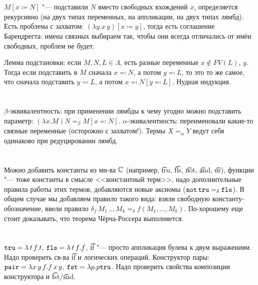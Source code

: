 \section{} %
$M[x \coloneq N]$ "--- подставили $N$ вместо свободных вхождений $x$,
определяется рекурсивно (на двух типах переменных, на аппликации, на двух типах лямбд).
Есть проблема с захватом: $(\lambda y. x\, y)[x \coloneq y]$, тогда есть соглашение
Барендрегта: имена связных выбираем так, чтобы они всегда отличались от имён свободных,
проблем не будет.

Лемма подстановки: если $M, N, L \in \Lambda$, есть разные переменные $x \notin FV(L)$, $y$.
Тогда если подставить в $M$ сначала $x\eqcolon N$, а потом $y \eqcolon L$, то это
то же самое, что сначала подставить $y \eqcolon L$, а потом $x\eqcolon N[y\eqcolon L]$.
Нудная индукция.

\section{} %
$\beta$-эквивалентность: при применении лямбды к чему угодно можно подставить параметр:
$(\lambda x . M)N =_\beta M[x\eqcolon N]$.
$\alpha$-экивалентность: переименовали какие-то связные переменные (осторожно с захватом!).
Термы $X=_\alpha Y$ ведут себя одинаково при редуцировании лямбд.
\TODO

\section{} %
Можно добавить константы из мн-ва $\mathbb{C}$ (например, \t{tru}, \t{fls}, \t{not}, \t{and}, \t{or}),
функции "--- тоже константы в смысле <<константный терм>>,
надо дополнительные правила работы этих термов, добавляются новые аксиомы ($\texttt{not}\,\texttt{tru}=_\delta \texttt{fls}$).
В общем случае мы добавляем правило такого вида: взяли свободную константу-обозначение,
ввели правило $\delta_f\,M_1\,\dots\,M_k =_\delta f(M_1, \dots, M_k)$.
По-хорошему еще стоит доказывать, что теорема Чёрча-Россера выполняется.

\section{} %
$\texttt{tru} = \lambda\,t\,f.t$, $\texttt{fls} = \lambda\,t\,f.f$,
\t{if} "--- просто аппликация булева к двум выражениям.
Надо проверить св-ва \t{if} и логических операций.
Конструктор пары: $\texttt{pair} = \lambda x\,y\,f.f\,x\,y$, $\texttt{fst}=\lambda p.p \texttt{tru}$.
Надо проверить свойства композиции конструктора и \t{fst}/\t{snd}.

